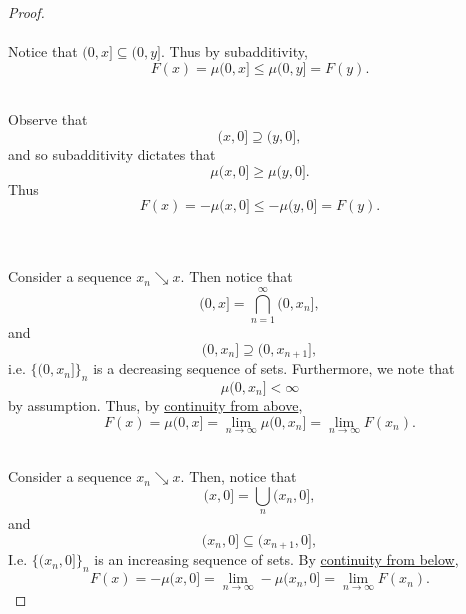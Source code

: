 \documentclass[notoc,notitlepage]{tufte-book}
\begin{document}
\begin{proof}
   \\
  \noindent {} \\
  Notice that $(0, x] \subseteq (0, y]$. Thus by subadditivity,
  \begin{equation*}
    F(x) = \mu(0, x] \leq \mu(0, y] = F(y).
  \end{equation*}

  \noindent {} \\
  Observe that
  \begin{equation*}
    (x, 0] \supseteq (y, 0],
  \end{equation*}
  and so subadditivity dictates that
  \begin{equation*}
    \mu(x, 0] \geq \mu(y, 0].
  \end{equation*}
  Thus
  \begin{equation*}
    F(x) = - \mu(x, 0] \leq - \mu(y, 0] = F(y).
  \end{equation*}

  \noindent
   \\
  \noindent {} \\
  Consider a sequence $x_n \searrow x$.
  Then notice that
  \begin{equation*}
    (0, x] = \bigcap_{n=1}^{\infty} (0, x_n],
  \end{equation*}
  and
  \begin{equation*}
    (0, x_n] \supseteq (0, x_{n+1}],
  \end{equation*}
  i.e. $\{ (0, x_n] \}_n$ is a decreasing sequence of sets.
  Furthermore, we note that
  \begin{equation*}
    \mu(0, x_n] < \infty
  \end{equation*}
  by assumption.
  Thus, by \hyperref[thm:properties_of_a_measure]{continuity from above},
  \begin{equation*}
    F(x) = \mu(0, x] = \lim_{n \to \infty} \mu(0, x_n]
         = \lim_{n \to \infty} F(x_n).
  \end{equation*}

  \noindent {} \\
  Consider a sequence $x_n \searrow x$.
  Then, notice that
  \begin{equation*}
    (x, 0] = \bigcup_{n} (x_n, 0],
  \end{equation*}
  and
  \begin{equation*}
    (x_n, 0] \subseteq (x_{n+1}, 0],
  \end{equation*}
  I.e. $\{ (x_n, 0] \}_n$ is an increasing sequence of sets.
  By \hyperref[thm:properties_of_a_measure]{continuity from below},
  \begin{equation*}
    F(x) = - \mu(x, 0]
         = \lim_{n \to \infty} - \mu(x_n, 0]
         = \lim_{n \to \infty} F(x_n).
  \end{equation*}


\end{proof}
\end{document}
